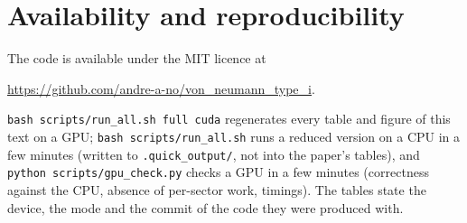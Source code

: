 \documentclass[11pt]{article}
\begin{document}
\section{Availability and reproducibility}

The code is available under the MIT licence at
\begin{center}\url{https://github.com/andre-a-no/von_neumann_type_i}.\end{center}
\texttt{bash scripts/run\_all.sh full cuda} regenerates every table and figure of this text on a GPU;
\texttt{bash scripts/run\_all.sh} runs a reduced version on a CPU in a few minutes (written to
\texttt{.quick\_output/}, not into the paper's tables), and \texttt{python scripts/gpu\_check.py} checks a GPU in a few
minutes (correctness against the CPU, absence of per-sector work, timings). The tables state the device, the mode
and the commit of the code they were produced with.
\end{document}
